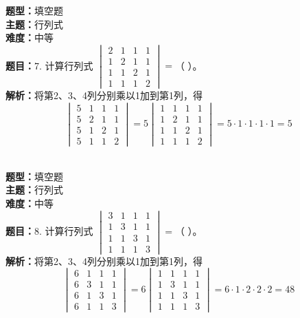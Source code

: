 \documentclass{ctexart}
\newenvironment{question}[5]{%
	\noindent\textbf{题型：}#1\\
	\textbf{主题：}#2\\
	\textbf{难度：}#3\\
	\textbf{题目：}#4\\
	\textbf{解析：}#5\\
	\vspace{1em}
}{}
\begin{document}
	\begin{question}
		{填空题}
		{行列式}
		{中等}
		{7. 计算行列式 $\begin{vmatrix}2 & 1 & 1 & 1 \\ 1 & 2 & 1 & 1 \\ 1 & 1 & 2 & 1 \\ 1 & 1 & 1 & 2\end{vmatrix}=$（ ）。}
		{将第2、3、4列分别乘以1加到第1列，得
			$$
			\begin{vmatrix}
				5 & 1 & 1 & 1 \\
				5 & 2 & 1 & 1 \\
				5 & 1 & 2 & 1 \\
				5 & 1 & 1 & 2
			\end{vmatrix}=5\begin{vmatrix}
				1 & 1 & 1 & 1 \\
				1 & 2 & 1 & 1 \\
				1 & 1 & 2 & 1 \\
				1 & 1 & 1 & 2
			\end{vmatrix}=5\cdot1\cdot1\cdot1\cdot1=5
			$$}
	\end{question}
	
	\begin{question}
		{填空题}
		{行列式}
		{中等}
		{8. 计算行列式 $\begin{vmatrix}3 & 1 & 1 & 1 \\ 1 & 3 & 1 & 1 \\ 1 & 1 & 3 & 1 \\ 1 & 1 & 1 & 3\end{vmatrix}=$（ ）。}
		{将第2、3、4列分别乘以1加到第1列，得
			$$
			\begin{vmatrix}
				6 & 1 & 1 & 1 \\
				6 & 3 & 1 & 1 \\
				6 & 1 & 3 & 1 \\
				6 & 1 & 1 & 3
			\end{vmatrix}=6\begin{vmatrix}
				1 & 1 & 1 & 1 \\
				1 & 3 & 1 & 1 \\
				1 & 1 & 3 & 1 \\
				1 & 1 & 1 & 3
			\end{vmatrix}=6\cdot1\cdot2\cdot2\cdot2=48
			$$}
	\end{question}
	
\end{document}
